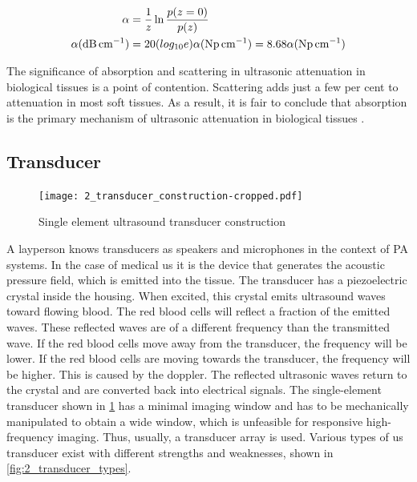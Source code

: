 \begin{subequations} \label{eq:2_attenuation_coefficient}
	\begin{align}
		\ensuremath{\alpha &= \frac{1}{z} \ln \frac{p(z=0)}{p(z)} \\
		\alpha( \si{\dB\per\centi\meter} ) &= 20 ( log_{10}e) \alpha ( \si{\neper\per\centi\meter}) = 8.68\alpha (\si{\neper\per\centi\meter})}
	\end{align}
\end{subequations}

The significance of absorption and scattering in ultrasonic attenuation in biological tissues is a point of contention. Scattering adds just a few per cent to attenuation in most soft tissues. As a result, it is fair to conclude that absorption is the primary mechanism of ultrasonic attenuation in biological tissues \cite{ShungUltrasound_Book}.

\subsection{Transducer}

\begin{figure}[ht]
	\centering
	\texttt{[image: 2\_transducer\_construction-cropped.pdf]}
	\caption[Single element ultrasound transducer construction]{Single element ultrasound transducer construction \cite{JensenUltrasoundBook}}
	\label{fig:2_transducer_construction}
\end{figure}

A layperson knows transducers as speakers and microphones in the context of PA systems. In the case of medical \gls{us} it is the device that generates the acoustic pressure field, which is emitted into the tissue. The transducer has a piezoelectric crystal inside the housing. When excited, this crystal emits ultrasound waves toward flowing blood. The red blood cells will reflect a fraction of the emitted waves. These reflected waves are of a different frequency than the transmitted wave. If the red blood cells move away from the transducer, the frequency will be lower. If the red blood cells are moving towards the transducer, the frequency will be higher. This is caused by the \gls{doppler}. The reflected ultrasonic waves return to the crystal and are converted back into electrical signals. The single-element transducer shown in \cref{fig:2_transducer_construction} has a minimal imaging window and has to be mechanically manipulated to obtain a wide window, which is unfeasible for responsive high-frequency imaging. Thus, usually, a transducer array is used. Various types of \gls{us} transducer exist with different strengths and weaknesses, shown in \cref{fig:2_transducer_types}. 

